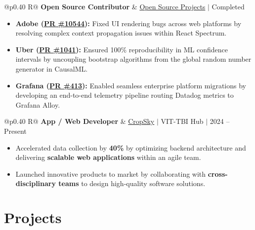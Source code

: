 \documentclass[a4paper,10pt]{article}
\newcommand{\ulink}[2]{\href{#1}{#2}}
\newcommand{\subheading}[1]{{\color[HTML]{0A0A0A}\fontsize{12}{14}\selectfont\bfseries #1}}
\newcommand{\meta}[1]{{\color[HTML]{5C5C5C}\fontsize{10.5}{12.5}\selectfont #1}}
\begin{document}
\begin{tabularx}{\linewidth}{@{}p{0.40\linewidth} R@{}}
\subheading{Open Source Contributor} & \meta{\ulink{https://github.com/su-jin1425/My-Open-Source-Contributions}{Open Source Projects} $|$ Completed}
\end{tabularx}
\begin{itemize}[nosep, leftmargin=1.5em, itemsep=2pt, topsep=2pt]
  \item {\color[HTML]{0A0A0A}\fontsize{11}{14}\selectfont \textbf{Adobe (\ulink{https://github.com/adobe/react-spectrum/pull/10544}{PR \#10544}):} Fixed UI rendering bugs across web platforms by resolving complex context propagation issues within React Spectrum.}
  \item {\color[HTML]{0A0A0A}\fontsize{11}{14}\selectfont \textbf{Uber (\ulink{https://github.com/uber/causalml/pull/1041}{PR \#1041}):} Ensured 100\% reproducibility in ML confidence intervals by uncoupling bootstrap algorithms from the global random number generator in CausalML.}
  \item {\color[HTML]{0A0A0A}\fontsize{11}{14}\selectfont \textbf{Grafana (\ulink{https://github.com/grafana/alloy-scenarios/pull/413}{PR \#413}):} Enabled seamless enterprise platform migrations by developing an end-to-end telemetry pipeline routing Datadog metrics to Grafana Alloy.}
\end{itemize}

\begin{tabularx}{\linewidth}{@{}p{0.40\linewidth} R@{}}
\subheading{App / Web Developer} & \meta{\ulink{https://sites.google.com/view/cropsky/home}{CropSky} $|$ VIT-TBI Hub $|$ 2024 -- Present}
\end{tabularx}
\begin{itemize}[nosep, leftmargin=1.5em, itemsep=2pt, topsep=2pt]
  \item {\color[HTML]{0A0A0A}\fontsize{11}{14}\selectfont Accelerated data collection by \textbf{40\%} by optimizing backend architecture and delivering \textbf{scalable web applications} within an agile team.}
  \item {\color[HTML]{0A0A0A}\fontsize{11}{14}\selectfont Launched innovative products to market by collaborating with \textbf{cross-disciplinary teams} to design high-quality software solutions.}
\end{itemize}


\section{Projects}
\vspace{2pt}
\end{document}
